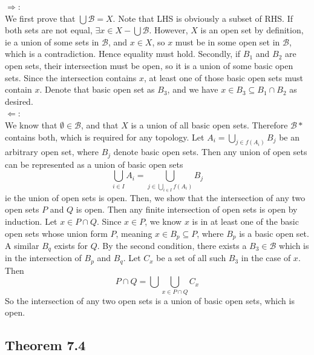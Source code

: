 \begin{solution}
 $\Rightarrow$: \\
 We first prove that $\bigcup \mathcal{B} = X$. Note that LHS is obviously a subset of RHS. If both sets are not equal, $\exists x \in X - \bigcup \mathcal{B}$. However, $X$ is an open set by definition, ie a union of some sets in $\mathcal{B}$, and $x \in X$, so $x$ must be in some open set in $\mathcal{B}$, which is a contradiction. Hence equality must hold. Secondly, if $B_1$ and $B_2$ are open sets, their intersection must be open, so it is a union of some basic open sets. Since the intersection contains $x$, at least one of those basic open sets must contain $x$. Denote that basic open set as $B_3$, and we have $x \in B_3 \subseteq B_1 \cap B_2$ as desired. \\
 $\Leftarrow$: \\
 We know that $\emptyset \in \mathcal{B}$, and that $X$ is a union of all basic open sets. Therefore $\mathcal{B}*$ contains both, which is required for any topology. Let $A_i = \bigcup_{j \in f(A_i)} B_j$ be an arbitrary open set, where $B_j$ denote basic open sets. Then any union of open sets can be represented as a union of basic open sets $$\bigcup_{i \in I} A_i = \bigcup_{j \in \bigcup_{i \in I} f(A_i)} B_j$$ ie the union of open sets is open. Then, we show that the intersection of any two open sets $P$ and $Q$ is open. Then any finite intersection of open sets is open by induction. Let $x \in P \cap Q$. Since $x \in P$, we know $x$ is in at least one of the basic open sets whose union form $P$, meaning $x \in B_p \subseteq P$, where $B_p$ is a basic open set. A similar $B_q$ exists for $Q$. By the second condition, there exists a $B_3 \in \mathcal{B}$ which is in the intersection of $B_p$ and $B_q$. Let $C_x$ be a set of all such $B_3$ in the case of $x$. Then
 $$P \cap Q = \bigcup \bigcup_{x \in P \cap Q} C_x$$
 So the intersection of any two open sets is a union of basic open sets, which is open.
 \end{solution}

\subsection{Theorem 7.4}
\setcounter{question}{0}



